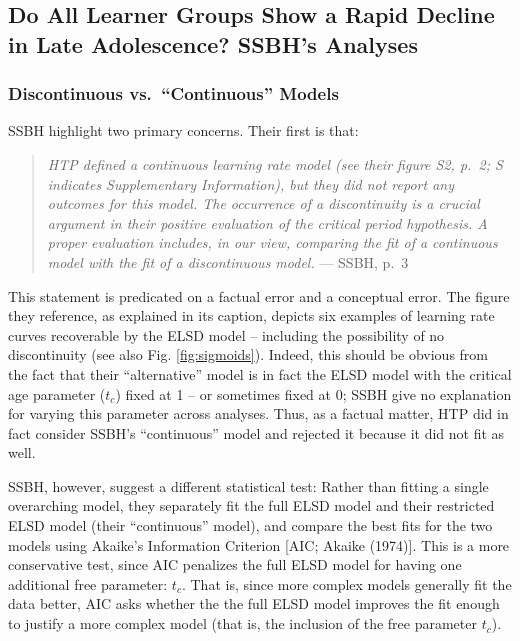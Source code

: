 \documentclass[
  english,
  doc,floatsintext]{apa6}
\begin{document}
\hypertarget{do-all-learner-groups-show-a-rapid-decline-in-late-adolescence-ssbhs-analyses}{%
\subsection{Do All Learner Groups Show a Rapid Decline in Late Adolescence? SSBH's Analyses}\label{do-all-learner-groups-show-a-rapid-decline-in-late-adolescence-ssbhs-analyses}}

\hypertarget{discontinuous-vs.-continuous-models}{%
\subsubsection{Discontinuous vs.~``Continuous'' Models}\label{discontinuous-vs.-continuous-models}}

SSBH highlight two primary concerns. Their first is that:

\begin{quote}
\emph{HTP defined a continuous learning rate model (see their figure S2, p.~2; S indicates Supplementary Information), but they did not report any outcomes for this model. The occurrence of a discontinuity is a crucial argument in their positive evaluation of the critical period hypothesis. A proper evaluation includes, in our view, comparing the fit of a continuous model with the fit of a discontinuous model.}
\hfill --- SSBH, p.~3
\end{quote}

This statement is predicated on a factual error and a conceptual error. The figure they reference, as explained in its caption, depicts six examples of learning rate curves recoverable by the ELSD model -- including the possibility of no discontinuity (see also Fig. \ref{fig:sigmoids}). Indeed, this should be obvious from the fact that their ``alternative'' model is in fact the ELSD model with the critical age parameter (\(t_c\)) fixed at 1 -- or sometimes fixed at 0; SSBH give no explanation for varying this parameter across analyses. Thus, as a factual matter, HTP did in fact consider SSBH's ``continuous'' model and rejected it because it did not fit as well.

SSBH, however, suggest a different statistical test: Rather than fitting a single overarching model, they separately fit the full ELSD model and their restricted ELSD model (their ``continuous'' model), and compare the best fits for the two models using Akaike's Information Criterion {[}AIC; Akaike (1974){]}. This is a more conservative test, since AIC penalizes the full ELSD model for having one additional free parameter: \(t_c\). That is, since more complex models generally fit the data better, AIC asks whether the the full ELSD model improves the fit enough to justify a more complex model (that is, the inclusion of the free parameter \(t_c\)).
\end{document}
